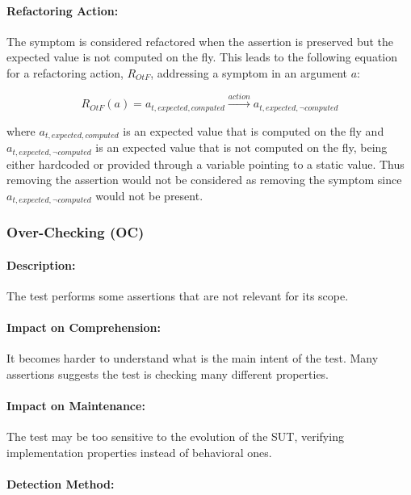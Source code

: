 \paragraph{Refactoring Action:}

The symptom is considered refactored when the assertion is preserved but the expected value is not computed on the fly. This leads to the following equation for a refactoring action, $R_{OtF}$, addressing a symptom in an argument $a$:

\begin{equation*}
    R_{OtF}(a) =  a_{t, expected, computed} \xrightarrow{action} a_{t, expected, \neg computed}
\end{equation*}

where $a_{t, expected, computed}$ is an expected value that is computed on the fly and $a_{t, expected, \neg computed}$ is an expected value that is not computed on the fly, being either hardcoded or provided through a variable pointing to a static value. Thus removing the assertion would not be considered as removing the symptom since $a_{t, expected, \neg computed}$ would not be present.

\subsubsection{Over-Checking (OC)}

\paragraph{Description:}

The test performs some assertions that are not relevant for its scope.

\paragraph{Impact on Comprehension:} 

It becomes harder to understand what is the main intent of the test. Many assertions suggests the test is checking many different properties.

\paragraph{Impact on Maintenance:} 

The test may be too sensitive to the evolution of the SUT, verifying implementation properties instead of behavioral ones.

\paragraph{Detection Method:}

